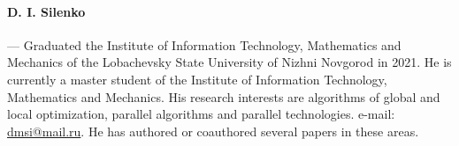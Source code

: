 \documentclass[12pt, a4paper, russian]{article}
\begin{document}
\paragraph{D. I. Silenko} --- Graduated the Institute of Information Technology, Mathematics and Mechanics of the Lobachevsky State University of Nizhni Novgorod in 2021. He is currently a master student of the Institute of Information Technology, Mathematics and Mechanics. His research interests are algorithms of global and local optimization, parallel algorithms and parallel technologies. e-mail: \url{dmsi@mail.ru}. He has authored or coauthored several papers in these areas.
\end{document}

